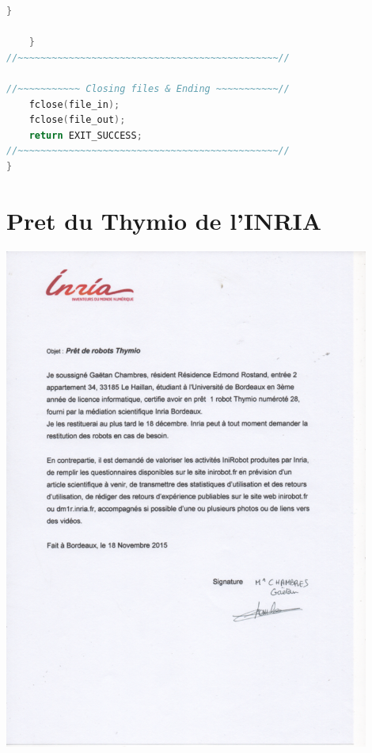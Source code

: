 \documentclass[a4paper, 12pt]{report}
\begin{document}
\begin{lstlisting}[language=C]
		}
		
	}
//~~~~~~~~~~~~~~~~~~~~~~~~~~~~~~~~~~~~~~~~~~~~~~//

//~~~~~~~~~~~ Closing files & Ending ~~~~~~~~~~~//	
	fclose(file_in);
	fclose(file_out);
	return EXIT_SUCCESS;
//~~~~~~~~~~~~~~~~~~~~~~~~~~~~~~~~~~~~~~~~~~~~~~//
}

\end{lstlisting}

\chapter*{Pret du Thymio de l'INRIA}
\includegraphics[width=0.9\textwidth]{pret.png}
\end{document}
